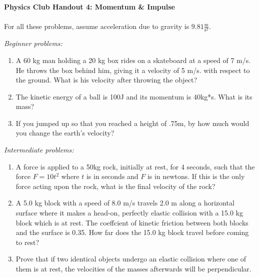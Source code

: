 \documentclass[12pt]{article}
\begin{document}
\textbf{Physics Club Handout 4: Momentum \& Impulse}
\\
\\
For all these problems, assume acceleration due to gravity is $9.81\frac{\text{m}}{\text{s}^2}$.

\emph{Beginner problems:}
\begin{enumerate}
\item
A 60 kg man holding a 20 kg box rides on a skateboard at a speed of 7 m/s. He throws the box behind him, giving it a velocity of 5 m/s. with respect to the ground. What is his velocity after throwing the object?

\item
The kinetic energy of a ball is 100J and its momentum is 40kg*s. What is its mass?

\item
If you jumped up so that you reached a height of .75m, by how much would you change the earth's velocity?

\end{enumerate}

\emph{Intermediate problems:}
\begin{enumerate}
\item
A force is applied to a 50kg rock, initially at rest, for 4 seconds, such that the force $F = 10t^2$ where $t$ is in seconds and $F$ is in newtons. If this is the only force acting upon the rock, what is the final velocity of the rock?

\item
A 5.0 kg block with a speed of 8.0 m/s travels 2.0 m along a horizontal surface where it makes a head-on, perfectly elastic collision with a 15.0 kg block which is at rest. The coeffcient of kinetic friction between both blocks and the surface is 0.35. How far does the 15.0 kg block travel before coming to rest?

\item
Prove that if two identical objects undergo an elastic collision where one of them is at rest, the velocities of the masses afterwards will be perpendicular.

\end{enumerate}
\end{document}
